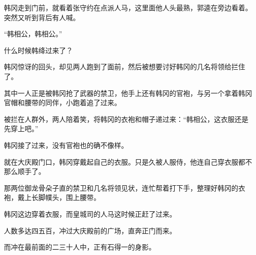 韩冈走到门前，就看着张守约在点派人马，这里面他人头最熟，郭逵在旁边看着。突然又听到背后有人喊。

“韩相公，韩相公。”

什么时候韩绛过来了？

韩冈惊讶的回头，却见两人跑到了面前，然后被想要讨好韩冈的几名将领给拦住了。

其中一人正是被韩冈抢了武器的禁卫，他手上还有韩冈的官袍，与另一个拿着韩冈官帽和腰带的同伴，小跑着追了过来。

被拦在人群外，两人陪着笑，将韩冈的衣袍和帽子递过来：“韩相公，这衣服还是先穿上吧。”

韩冈接了过来，没有官袍也的确不像样。

就在大庆殿门口，韩冈穿戴起自己的衣服。只是久被人服侍，他连自己穿衣服都不那么顺手了。

那两位御龙骨朵子直的禁卫和几名将领见状，连忙帮着打下手，整理好韩冈的衣袍，戴上长脚幞头，围上腰带。

韩冈这边穿着衣服，而皇城司的人马这时候正赶了过来。

人数多达四五百，冲过大庆殿前的广场，直奔正门而来。

而冲在最前面的二三十人中，正有石得一的身影。

